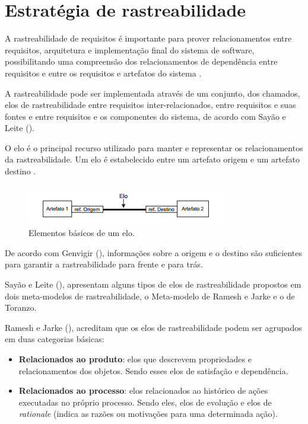   
  \section{Estratégia de rastreabilidade}
  
    A rastreabilidade de requisitos é importante para prover relacionamentos entre requisitos, 
    arquitetura e implementação final do sistema de software, 
    possibilitando uma compreensão dos relacionamentos de dependência entre 
    requisitos e entre os requisitos e artefatos do sistema \cite{sayao05}.
  
    A rastreabilidade pode ser implementada através de um conjunto,
    dos chamados, elos de rastreabilidade entre requisitos inter-relacionados, 
    entre requisitos e suas fontes e entre requisitos e os componentes do sistema, 
    de acordo com Sayão e Leite (\citeyear{sayao05}).
  
    O elo é o principal recurso utilizado para manter e representar os relacionamentos da rastreabilidade. 
    Um elo é estabelecido entre um artefato origem e um artefato destino \cite{genvigir09}.
  
    \begin{figure}[!htbp]
      \centering
      \includegraphics[scale=1]{editaveis/figuras/elo}
      \caption[Elementos básicos de um elo.] {Elementos básicos de um elo. \footnotemark}
      \label{elo}
    \end{figure}
  
    De acordo com Genvigir (\citeyear{genvigir09}), 
    informações sobre a origem e o destino são suficientes para garantir a rastreabilidade para frente e para trás.
  
    Sayão e Leite (\citeyear{sayao05}), apresentam alguns tipos de elos de rastreabilidade 
    propostos em dois meta-modelos de rastreabilidade, 
    o Meta-modelo de Ramesh e Jarke e o de Toranzo.

    Ramesh e Jarke (\citeyear{ramesh01}), acreditam que os elos de rastreabilidade podem ser agrupados em duas categorias básicas:
    \begin{itemize}
      \item \textbf{Relacionados ao produto}: elos que descrevem propriedades e relacionamentos dos objetos. Sendo esses elos de satisfação e dependência.
      \item \textbf{Relacionados ao processo}: elos relacionados ao histórico de ações executadas no próprio processo. Sendo eles, elos de evolução  e elos de \textit{rationale} (indica as razões ou motivações para uma determinada ação).
    \end{itemize}

